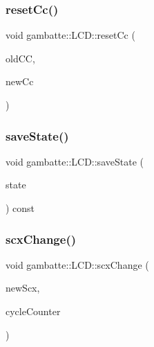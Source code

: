 \mbox{\label{classgambatte_1_1LCD_a94ef057d9f530884b5b66bab3a4a5500}} 
\subsubsection{\texorpdfstring{reset\+Cc()}{resetCc()}}
{\footnotesize\ttfamily void gambatte\+::\+L\+C\+D\+::reset\+Cc (\begin{DoxyParamCaption}\item[{unsigned}]{old\+CC,  }\item[{unsigned}]{new\+Cc }\end{DoxyParamCaption})}

\mbox{\label{classgambatte_1_1LCD_a26c4d435be473121e49887c692df9929}} 
\subsubsection{\texorpdfstring{save\+State()}{saveState()}}
{\footnotesize\ttfamily void gambatte\+::\+L\+C\+D\+::save\+State (\begin{DoxyParamCaption}\item[{\hyperlink{structgambatte_1_1SaveState}{Save\+State} \&}]{state }\end{DoxyParamCaption}) const}

\mbox{\label{classgambatte_1_1LCD_aaac41f27fac136de6a13d7f92ccf64fa}} 
\subsubsection{\texorpdfstring{scx\+Change()}{scxChange()}}
{\footnotesize\ttfamily void gambatte\+::\+L\+C\+D\+::scx\+Change (\begin{DoxyParamCaption}\item[{unsigned}]{new\+Scx,  }\item[{unsigned}]{cycle\+Counter }\end{DoxyParamCaption})}

